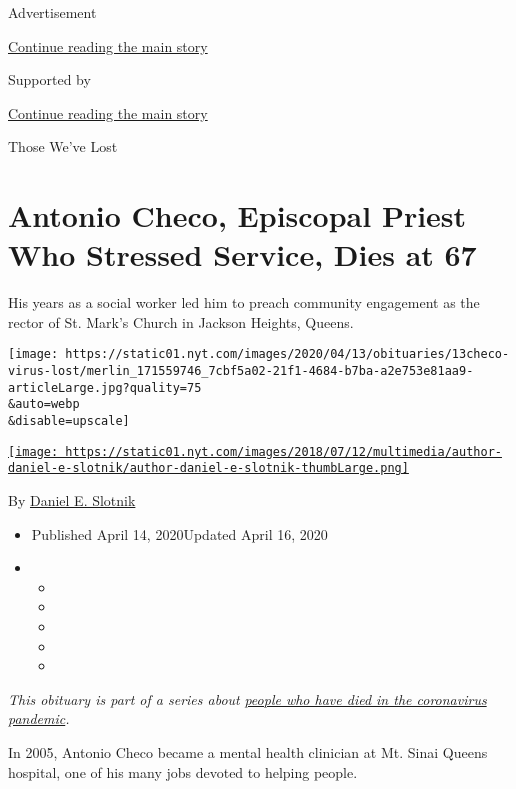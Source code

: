 Advertisement

\protect\hyperlink{after-top}{Continue reading the main story}

Supported by

\protect\hyperlink{after-sponsor}{Continue reading the main story}

Those We've Lost

\hypertarget{antonio-checo-episcopal-priest-who-stressed-service-dies-at-67}{%
\section{Antonio Checo, Episcopal Priest Who Stressed Service, Dies at
67}\label{antonio-checo-episcopal-priest-who-stressed-service-dies-at-67}}

His years as a social worker led him to preach community engagement as
the rector of St. Mark's Church in Jackson Heights, Queens.

\texttt{[image: https://static01.nyt.com/images/2020/04/13/obituaries/13checo-virus-lost/merlin\_171559746\_7cbf5a02-21f1-4684-b7ba-a2e753e81aa9-articleLarge.jpg?quality=75\\\&auto=webp\\\&disable=upscale]}

\href{https://www.nytimes.com/by/daniel-e-slotnik}{\texttt{[image: https://static01.nyt.com/images/2018/07/12/multimedia/author-daniel-e-slotnik/author-daniel-e-slotnik-thumbLarge.png]}}

By \href{https://www.nytimes.com/by/daniel-e-slotnik}{Daniel E. Slotnik}

\begin{itemize}
\item
  Published April 14, 2020Updated April 16, 2020
\item
  \begin{itemize}
  \item
  \item
  \item
  \item
  \item
  \end{itemize}
\end{itemize}

\emph{This obituary is part of a series about}
\href{https://www.nytimes.com/series/people-who-have-died-of-the-coronavirus}{\emph{people
who have died in the coronavirus pandemic}}\emph{.}

In 2005, Antonio Checo became a mental health clinician at Mt. Sinai
Queens hospital, one of his many jobs devoted to helping people.

